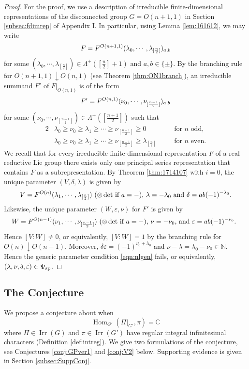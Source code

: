 \begin{proof}
For the proof,
 we use a description 
 of irreducible finite-dimensional representations
 of the disconnected group $G=O(n+1,1)$
 in Section \ref{subsec:fdimrep}
 of Appendix I.  
In particular,
 using Lemma \ref{lem:161612}, 
we may write 
\[
  F = F^{{O(n+1,1)}}({\lambda_0, \cdots, \lambda_{[\frac n 2]}})_{a, b}
\]
for some $(\lambda_0, \cdots, \lambda_{[\frac n 2]})\in \Lambda^+([\frac n 2]+1)$ and $a, b \in \{\pm\}$.  
By the branching rule 
 for $O(n+1,1) \downarrow O(n,1)$
 (see Theorem \ref{thm:ON1branch}), 
 an irreducible summand $F'$ of $F|_{O(n,1)}$ is of the form
\[
  F' = F^{{O(n,1)}}({\nu_0, \cdots, \nu_{[\frac {n-1} 2]}})_{a, b}
\]
for some $(\nu_0, \cdots, \nu_{[\frac {n-1} 2]})\in \Lambda^+([\frac {n+1} 2])$ such that 
\begin{alignat*}{2}
&\lambda_{0} \ge \nu_{0} \ge \lambda_{1} \ge \cdots \ge \nu_{[\frac{n-1}2]} \ge 0\quad
&&\text{for $n$ odd}, 
\\
&\lambda_{0} \ge \nu_{0} \ge \lambda_{1} \ge \cdots \ge \nu_{[\frac{n-1}2]} \ge \lambda_{[\frac n 2]}
\quad
&&\text{for $n$ even}.   
\end{alignat*}
We recall 
 that for every irreducible finite-dimensional representation $F$
 of a real reductive Lie group
 there exists only one principal series representation
 that contains $F$ 
 as a subrepresentation.  
By Theorem \ref{thm:1714107} with $i=0$, 
 the unique parameter $(V, \delta, \lambda)$ is given
 by 
\[
\text{$V=F^{{O(n)}}({\lambda_1, \cdots, \lambda_{[\frac n 2]}})$
 ($\otimes \det$ if $a=-$), 
 $\lambda=-\lambda_0$ and $\delta=a b (-1)^{-\lambda_0}$.}
\]  
Likewise, 
 the unique parameter $(W, \varepsilon, \nu)$ for $F'$
 is given by 
\[
 \text{$W=F^{{O(n-1)}}({\nu_1, \cdots, \nu_{[\frac {n-1} 2]}})$
 ($\otimes \det$ if $a=-$), 
 $\nu=-\nu_0$, 
 and $\varepsilon = a b (-1)^{-\nu_0}$.  }
\]
Hence $[V:W]\ne 0$, 
 or equivalently,
 $[V:W]=1$ 
 by the branching rule 
 for $O(n) \downarrow O(n-1)$.  
Moreover, 
 $\delta \varepsilon = (-1)^{\nu_0 + \lambda_0}$
 and $\nu-\lambda= \lambda_0 -\nu_0 \in {\mathbb{N}}$.  
Hence the generic parameter condition \eqref{eqn:nlgen} fails, 
 or equivalently,
$(\lambda, \nu, \delta, \varepsilon) \in \Psi_{{\operatorname{sp}}}$. 
 
\end{proof}



\subsection{The Conjecture}
\label{subsec:13.2}
We propose a conjecture about when 
\[
{\operatorname{Hom}}_{G'}(\Pi|_{G'},\pi)={\mathbb{C}}
\]
where $\Pi \in {\operatorname{Irr}}(G)$ and $\pi \in {\operatorname{Irr}}(G')$ have regular integral infinitesimal characters
 (Definition \ref{def:intreg}).  
We give two formulations of the conjecture, 
 see Conjectures \ref{conj:GPver1} and \ref{conj:V2} below.  
Supporting evidence is given in Section \ref{subsec:SuppConj}.  


